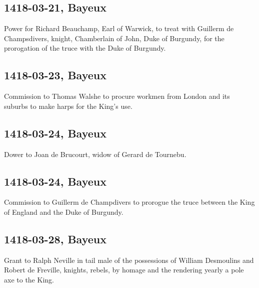 \documentclass[a4paper,12pt,twoside]{book}
\begin{document}
                
                \subsection{1418-03-21, Bayeux}
                
                
                  Power for Richard Beauchamp, Earl of Warwick, to treat with Guillerm de Champsdivers, knight, Chamberlain of John, Duke of Burgundy, for the prorogation of the truce with the Duke of Burgundy.
               
                
                \subsection{1418-03-23, Bayeux}
                
                
                  Commission to Thomas Walshe to procure workmen from London and its suburbs to make harps for the King's use.
               
                
                \subsection{1418-03-24, Bayeux}
                
                
                  Dower to Joan de Brucourt, widow of Gerard de Tournebu.
               
                
                \subsection{1418-03-24, Bayeux}
                
                
                  Commission to Guillerm de Champdivers to prorogue the truce between the King of England and the Duke of Burgundy.
               
                
                \subsection{1418-03-28, Bayeux}
                
                
                  Grant to Ralph Neville in tail male of the possessions of William Desmoulins and Robert de Freville, knights, rebels, by homage and the rendering yearly a pole axe to the King.
               
\end{document}
